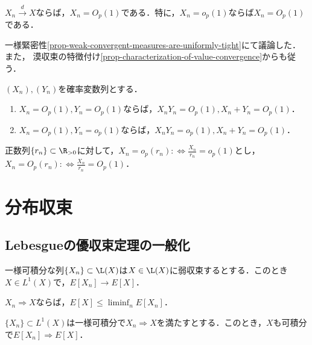 \documentclass[uplatex,dvipdfmx]{jsreport}
\begin{document}
\begin{lemma}[分布収束列は一様に緊密である]
    $X_n\xrightarrow{d}X$ならば，$X_n=O_p(1)$である．特に，$X_n=o_p(1)$ならば$X_n=O_p(1)$である．
\end{lemma}
\begin{Proof}
    一様緊密性\ref{prop-weak-convergent-measures-are-uniformly-tight}にて議論した．
    また，
    漠収束の特徴付け\ref{prop-characterization-of-value-convergence}からも従う．
\end{Proof}

\begin{lemma}[一様に緊密な確率変数列の積も和も一様に緊密]
    $(X_n),(Y_n)$を確率変数列とする．
    \begin{enumerate}
        \item $X_n=O_p(1),Y_n=O_p(1)$ならば，$X_nY_n=O_p(1),X_n+Y_n=O_p(1)$．
        \item $X_n=O_p(1),Y_n=o_p(1)$ならば，$X_nY_n=o_p(1),X_n+Y_n=O_p(1)$．
    \end{enumerate}
\end{lemma}

\begin{definition}
    正数列$\{r_n\}\subset\R_{>0}$に対して，$X_n=o_p(r_n):\Leftrightarrow\frac{X_n}{r_n}=o_p(1)$とし，$X_n=O_p(r_n):\Leftrightarrow\frac{X_n}{r_n}=O_p(1)$．
\end{definition}

\section{分布収束}

\subsection{Lebesgueの優収束定理の一般化}

\begin{theorem}
    一様可積分な列$\{X_n\}\subset\L(X)$は$X\in\L(X)$に弱収束するとする．このとき$X\in L^1(X)$で，$E[X_n]\to E[X]$．
\end{theorem}

\begin{theorem}
    $X_n\Rightarrow X$ならば，$E[X]\le\liminf_nE[X_n]$．
\end{theorem}

\begin{theorem}
    $\{X_n\}\subset L^1(X)$は一様可積分で$X_n\Rightarrow X$を満たすとする．このとき，$X$も可積分で$E[X_n]\Rightarrow E[X]$．
\end{theorem}
\end{document}

